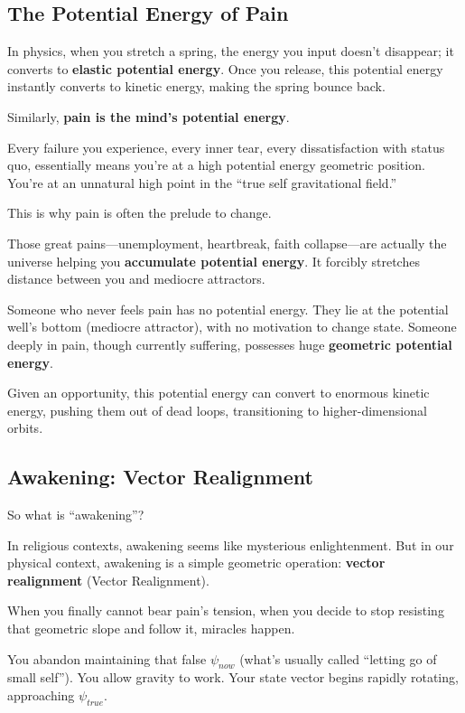 \documentclass[11pt,a4paper,twoside]{book}
\begin{document}
\subsection{The Potential Energy of Pain}

In physics, when you stretch a spring, the energy you input doesn't disappear; it converts to \textbf{elastic potential energy}. Once you release, this potential energy instantly converts to kinetic energy, making the spring bounce back.

Similarly, \textbf{pain is the mind's potential energy}.

Every failure you experience, every inner tear, every dissatisfaction with status quo, essentially means you're at a high potential energy geometric position. You're at an unnatural high point in the ``true self gravitational field.''

This is why pain is often the prelude to change.

Those great pains---unemployment, heartbreak, faith collapse---are actually the universe helping you \textbf{accumulate potential energy}. It forcibly stretches distance between you and mediocre attractors.

Someone who never feels pain has no potential energy. They lie at the potential well's bottom (mediocre attractor), with no motivation to change state. Someone deeply in pain, though currently suffering, possesses huge \textbf{geometric potential energy}.

Given an opportunity, this potential energy can convert to enormous kinetic energy, pushing them out of dead loops, transitioning to higher-dimensional orbits.

\subsection{Awakening: Vector Realignment}

So what is ``awakening''?

In religious contexts, awakening seems like mysterious enlightenment. But in our physical context, awakening is a simple geometric operation: \textbf{vector realignment} (Vector Realignment).

When you finally cannot bear pain's tension, when you decide to stop resisting that geometric slope and follow it, miracles happen.

You abandon maintaining that false $\psi_{now}$ (what's usually called ``letting go of small self''). You allow gravity to work. Your state vector begins rapidly rotating, approaching $\psi_{true}$.
\end{document}
